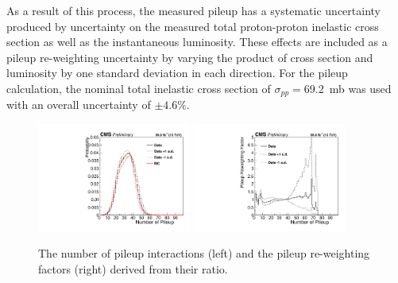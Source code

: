 As a result of this process, the measured pileup has a systematic uncertainty produced by uncertainty on the measured total proton-proton inelastic cross section as well as the instantaneous luminosity. 
These effects are included as a pileup re-weighting uncertainty by varying the product of cross section and luminosity by one standard deviation in each direction.
For the pileup calculation, the nominal total inelastic cross section of $\sigma_{pp}=$\SI{69.2}{\milli\barn} was used with an overall uncertainty of $\pm4.6\%$\cite{pileupCx}.

\begin{figure}[ht]
	\centering
	\includegraphics[width=0.45\textwidth]{figures/PileupDists.pdf}
	\hspace{0.01\textwidth}
	\includegraphics[width=0.45\textwidth]{figures/PileupRatioDists.pdf}
        \caption[Pileup Re-weighting Histograms]{The number of pileup interactions (left) and the pileup re-weighting factors (right) derived from their ratio.}
        \label{fig:pileup}
\end{figure}

